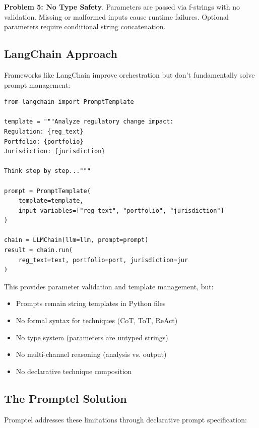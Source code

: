 \documentclass[11pt,a4paper]{article}
\begin{document}
\textbf{Problem 5: No Type Safety}. Parameters are passed via f-strings with no validation. Missing or malformed inputs cause runtime failures. Optional parameters require conditional string concatenation.

\subsection{LangChain Approach}

Frameworks like LangChain improve orchestration but don't fundamentally solve prompt management:

\begin{lstlisting}[caption=LangChain prompt management]
from langchain import PromptTemplate

template = """Analyze regulatory change impact:
Regulation: {reg_text}
Portfolio: {portfolio}
Jurisdiction: {jurisdiction}

Think step by step..."""

prompt = PromptTemplate(
    template=template,
    input_variables=["reg_text", "portfolio", "jurisdiction"]
)

chain = LLMChain(llm=llm, prompt=prompt)
result = chain.run(
    reg_text=text, portfolio=port, jurisdiction=jur
)
\end{lstlisting}

This provides parameter validation and template management, but:

\begin{itemize}
\item Prompts remain string templates in Python files
\item No formal syntax for techniques (CoT, ToT, ReAct)
\item No type system (parameters are untyped strings)
\item No multi-channel reasoning (analysis vs. output)
\item No declarative technique composition
\end{itemize}

\subsection{The Promptel Solution}

Promptel addresses these limitations through declarative prompt specification:
\end{document}
